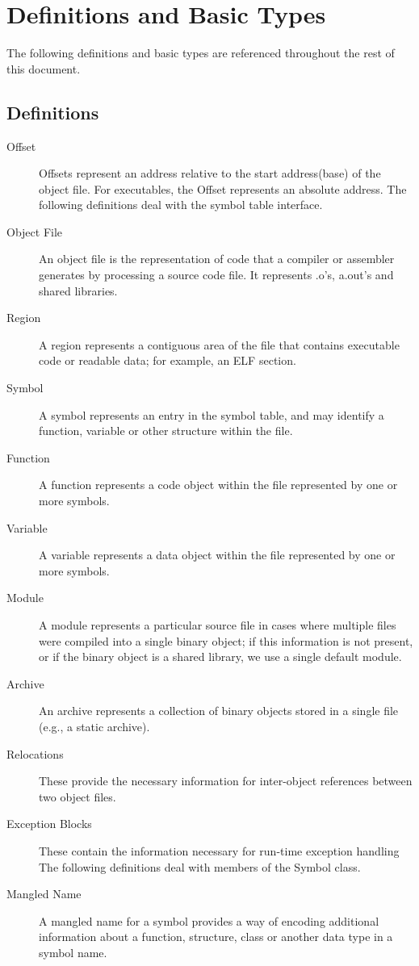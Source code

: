 \section{Definitions and Basic Types}

The following definitions and basic types are referenced throughout the rest of this document.

\subsection{Definitions}

\begin{description}
\item[Offset] Offsets represent an address relative to the start address(base) of the object file. For executables, the Offset represents an absolute address.
The following definitions deal with the symbol table interface.
\item[Object File] An object file is the representation of code that a compiler or assembler generates by processing a source code file. It represents .o's, a.out's and shared libraries.
\item[Region] A region represents a contiguous area of the file that contains executable code or readable data; for example, an ELF section.
\item[Symbol] A symbol represents an entry in the symbol table, and may identify a function, variable or other structure within the file.
\item[Function] A function represents a code object within the file represented by one or more symbols.
\item[Variable] A variable represents a data object within the file represented by one or more symbols.
\item[Module] A module represents a particular source file in cases where multiple files were compiled into a single binary object; if this information is not present, or if the binary object is a shared library, we use a single default module.
\item[Archive] An archive represents a collection of binary objects stored in a single file (e.g., a static archive). 
\item[Relocations] These provide the necessary information for inter-object references between two object files.
\item[Exception Blocks] These contain the information necessary for run-time exception handling
The following definitions deal with members of the Symbol class.
\item[Mangled Name] A mangled name for a symbol provides a way of encoding additional information about a function, structure, class or another data type in a symbol name.

\end{description}
